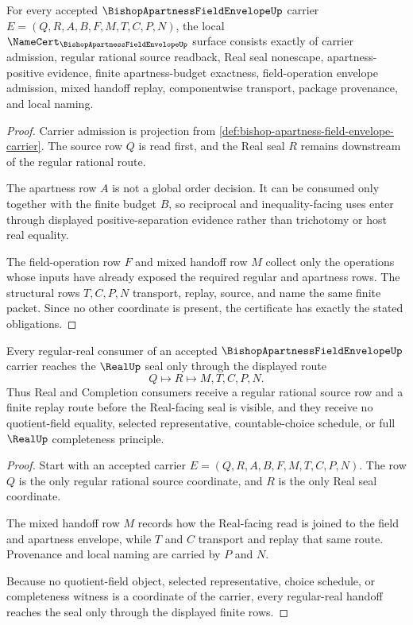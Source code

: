 \begin{theorem}\label{thm:bishop-apartness-field-envelope-namecert-obligations}
For every accepted $\BishopApartnessFieldEnvelopeUp$ carrier $E=(Q,R,A,B,F,M,T,C,P,N)$, the local $\NameCert_{\BishopApartnessFieldEnvelopeUp}$ surface consists exactly of carrier admission, regular rational source readback, Real seal nonescape, apartness-positive evidence, finite apartness-budget exactness, field-operation envelope admission, mixed handoff replay, componentwise transport, package provenance, and local naming.
\end{theorem}
\begin{proof}
Carrier admission is projection from \autoref{def:bishop-apartness-field-envelope-carrier}. The source row $Q$ is read first, and the Real seal $R$ remains downstream of the regular rational route.

The apartness row $A$ is not a global order decision. It can be consumed only together with the finite budget $B$, so reciprocal and inequality-facing uses enter through displayed positive-separation evidence rather than trichotomy or host real equality.

The field-operation row $F$ and mixed handoff row $M$ collect only the operations whose inputs have already exposed the required regular and apartness rows. The structural rows $T,C,P,N$ transport, replay, source, and name the same finite packet. Since no other coordinate is present, the certificate has exactly the stated obligations.
\end{proof}

\begin{theorem}\label{thm:bishop-apartness-field-envelope-regular-real-handoff}
Every regular-real consumer of an accepted $\BishopApartnessFieldEnvelopeUp$ carrier reaches the $\RealUp$ seal only through the displayed route
$$
Q \longmapsto R \longmapsto M,T,C,P,N .
$$
Thus Real and Completion consumers receive a regular rational source row and a finite replay route before the Real-facing seal is visible, and they receive no quotient-field equality, selected representative, countable-choice schedule, or full $\RealUp$ completeness principle.
\end{theorem}
\begin{proof}
Start with an accepted carrier $E=(Q,R,A,B,F,M,T,C,P,N)$. The row $Q$ is the only regular rational source coordinate, and $R$ is the only Real seal coordinate.

The mixed handoff row $M$ records how the Real-facing read is joined to the field and apartness envelope, while $T$ and $C$ transport and replay that same route. Provenance and local naming are carried by $P$ and $N$.

Because no quotient-field object, selected representative, choice schedule, or completeness witness is a coordinate of the carrier, every regular-real handoff reaches the seal only through the displayed finite rows.
\end{proof}

